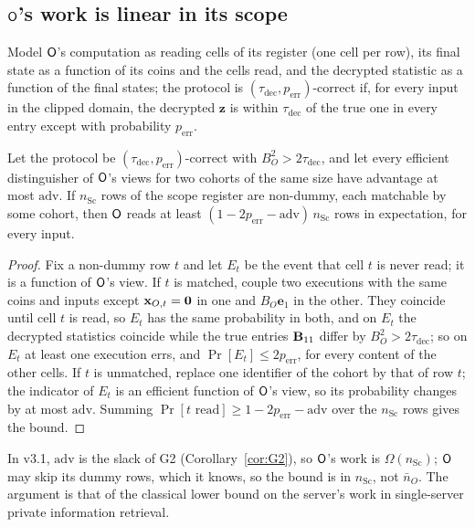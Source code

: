 \subsection{$\mathsf{O}$'s work is linear in its scope}

Model $\mathsf{O}$'s computation as reading cells of its register (one cell per row), its final state as a function of its coins and the cells read, and the decrypted statistic as a function of the final states; the protocol is $(\tau_{\mathrm{dec}},p_{\mathrm{err}})$-correct if, for every input in the clipped domain, the decrypted $\mathbf z$ is within $\tau_{\mathrm{dec}}$ of the true one in every entry except with probability $p_{\mathrm{err}}$.

\begin{proposition}\label{prop:lower}
Let the protocol be $(\tau_{\mathrm{dec}},p_{\mathrm{err}})$-correct with $B_O^2>2\tau_{\mathrm{dec}}$, and let every efficient distinguisher of $\mathsf{O}$'s views for two cohorts of the same size have advantage at most $\mathrm{adv}$. If $n_{\mathrm{Sc}}$ rows of the scope register are non-dummy, each matchable by some cohort, then $\mathsf{O}$ reads at least $(1-2p_{\mathrm{err}}-\mathrm{adv})\,n_{\mathrm{Sc}}$ rows in expectation, for every input.
\end{proposition}
\begin{proof}
Fix a non-dummy row $t$ and let $E_t$ be the event that cell $t$ is never read; it is a function of $\mathsf{O}$'s view. If $t$ is matched, couple two executions with the same coins and inputs except $\mathbf{x}_{O,t}=\mathbf 0$ in one and $B_O\mathbf e_1$ in the other. They coincide until cell $t$ is read, so $E_t$ has the same probability in both, and on $E_t$ the decrypted statistics coincide while the true entries $\mathbf{B}_{11}$ differ by $B_O^2>2\tau_{\mathrm{dec}}$; so on $E_t$ at least one execution errs, and $\Pr[E_t]\le2p_{\mathrm{err}}$, for every content of the other cells. If $t$ is unmatched, replace one identifier of the cohort by that of row $t$; the indicator of $E_t$ is an efficient function of $\mathsf{O}$'s view, so its probability changes by at most $\mathrm{adv}$. Summing $\Pr[t\text{ read}]\ge1-2p_{\mathrm{err}}-\mathrm{adv}$ over the $n_{\mathrm{Sc}}$ rows gives the bound.
\end{proof}
In v3.1, $\mathrm{adv}$ is the slack of G2 (Corollary~\ref{cor:G2}), so $\mathsf{O}$'s work is $\Omega(n_{\mathrm{Sc}})$; $\mathsf{O}$ may skip its dummy rows, which it knows, so the bound is in $n_{\mathrm{Sc}}$, not $\bar n_O$. The argument is that of the classical lower bound on the server's work in single-server private information retrieval.
